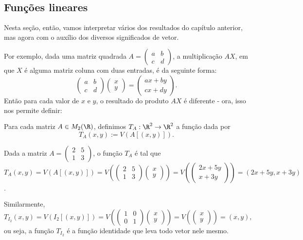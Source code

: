 \subsection{Funções lineares}

Nesta seção, então, vamos interpretar vários dos resultados do capítulo anterior, mas agora com o auxílio dos diversos significados de vetor.

Por exemplo, dada uma matriz quadrada $A=\begin{pmatrix}
a&b\\c&d
\end{pmatrix}$, a multiplicação $AX$, em que $X$ é alguma matriz coluna com duas entradas, é da seguinte forma:
\[\begin{pmatrix}
a&b\\c&d
\end{pmatrix}\begin{pmatrix}
x\\y
\end{pmatrix}=\begin{pmatrix}
ax+by\\cx+dy
\end{pmatrix}.\] Então para cada valor de $x$ e $y$, o resultado do produto $AX$ é diferente -  ora, isso nos permite definir:

\begin{df}
	Para cada matriz $A\in M_2(\R)$, definimos $T_A:\R^2\to \R^2$ a função dada por
	\[T_A(x,y):=V(A[(x,y)]).\]
\end{df}

\begin{ex}
	Dada a matriz $A=\begin{pmatrix}
	2 & 5\\
	1 & 3
	\end{pmatrix}$, o função $T_A$ é tal que
	\[T_A(x,y)=V(A[(x,y)])=V\left(\begin{pmatrix}
	2 & 5\\
	1 & 3
	\end{pmatrix}\begin{pmatrix}
	x\\y
	\end{pmatrix}\right)=V\left(\begin{pmatrix}
	2x+5y\\x+3y
	\end{pmatrix}\right)=(2x+5y,x+3y)\].
	
	Similarmente,
	\[T_{I_2}(x,y)=V(I_2[(x,y)])=V\left(\begin{pmatrix}
	1&0\\0&1
	\end{pmatrix}\begin{pmatrix}
	x\\y
	\end{pmatrix}\right)=V\left(\begin{pmatrix}
	x\\y
	\end{pmatrix}\right)=(x,y),\] ou seja, a função $T_{I_2}$ é a função identidade que leva todo vetor nele mesmo.
\end{ex}

